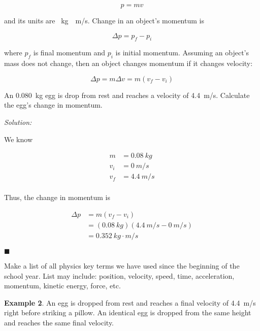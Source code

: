 \documentclass[dvipsnames]{article}
\begin{document}
\begin{equation*}
    p = m v
\end{equation*}

and its units are \SI{}{kg\cdot m/s}. Change in an object's momentum is 

\begin{equation*}
    \Delta p = p_f - p_i
\end{equation*}

where $p_f$ is final momentum and $p_i$ is initial momentum. Assuming an object's mass does not change, then an object changes momentum if it changes velocity:

\begin{equation*}
    \Delta p = m \Delta v = m(v_f - v_i)
\end{equation*}

\begin{example}
An \SI{0.080}{kg} egg is drop from rest and reaches a velocity of \SI{4.4}{m/s}. Calculate the egg's change in momentum.
\end{example}

\textit{Solution:}

We know

\vspace{-1em}
\begin{align*}
    m &= \SI{0.08}{kg} \\[1ex]
    v_i &= \SI{0}{m/s} \\[1ex]
    v_f &= \SI{4.4}{m/s} \\[1ex]
\end{align*}

Thus, the change in momentum is

\vspace{-1em}
\begin{align*}
    \Delta p &= m (v_f - v_i) \\[1ex]
    &= (\SI{0.08}{kg})(\SI{4.4}{m/s} - \SI{0}{m/s}) \\[1ex]
    &= \boxed{\SI{0.352}{kg\cdot m/s}}
\end{align*}

\hfill $\blacksquare$

Make a list of all physics key terms we have used since the beginning of the school year. List may include: position, velocity, speed, time, acceleration, momentum, kinetic energy, force, etc. 

\textbf{Example 2}. An egg is dropped from rest and reaches a final velocity of \SI{4.4}{m/s} right before striking a pillow. An identical egg is dropped from the same height and reaches the same final velocity. 
\end{document}
